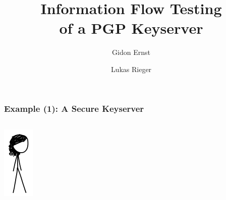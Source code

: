 \documentclass[12pt,english,dvipsnames]{beamer}
\author{Gidon Ernst \and Lukas Rieger}
\title{Information Flow Testing\\of a PGP Keyserver}
\institute[LMU Munich]{\mailto{gidon.ernst@lmu.de} \\ LMU Munich, Germany}
\date{}
\newcommand{\green}[1]{{\color{cpacheckergreen}#1}}
\begin{document}
\begin{frame}
  \titlepage
\end{frame}

\begin{frame}[fragile]
    \frametitle{Example (1): A \green{Secure} Keyserver}

    \begin{columns}[b]
        \begin{column}{1.5cm}
        \includegraphics[width=\textwidth]{images/meg.png}
        \end{column}


\end{columns}
\end{frame}
\end{document}

